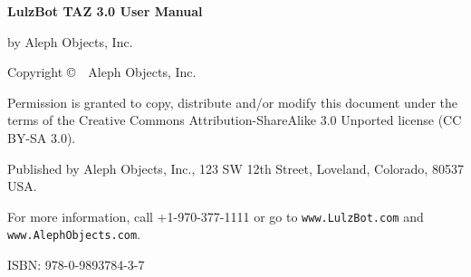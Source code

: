 \clearpage\null\vfill
\begingroup 
\thispagestyle{empty}
\footnotesize\raggedright
\setlength{\parskip}{0.5\baselineskip}

\textbf{LulzBot\textsuperscript{\miniscule{\texttrademark}} TAZ 3.0 User Manual}

by Aleph Objects, Inc.

Copyright \copyright\ \the\year\ Aleph Objects, Inc.\par
Permission is granted to copy, distribute and\slash or modify 
this document under the terms of the
Creative Commons Attribution-ShareAlike 3.0 Unported license
(CC BY-SA 3.0).

Published by Aleph Objects, Inc., 123 SW 12th Street, Loveland, Colorado, 80537 USA.

For more information, call +1-970-377-1111 or go to \texttt{www.LulzBot.com} and \texttt{www.AlephObjects.com}.

ISBN: 978-0-9893784-3-7
\hfill\texttt{\the\year\the\month\the\day}
\endgroup
\pagebreak{}

